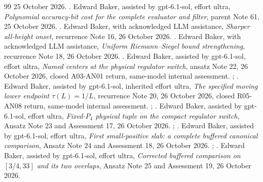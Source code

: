 \begin{thebibliography}{99}
25 October 2026.
.
 Edward Baker, assisted by gpt-6.1-sol, effort ultra,
\emph{Polynomial accuracy-bit cost for the complete evaluator and filter},
parent Note 61, 25 October 2026.
.
 Edward Baker, with acknowledged LLM assistance,
\emph{Sharper all-height onset}, recurrence Note 16, 26 October 2026.
.
 Edward Baker, with acknowledged LLM assistance,
\emph{Uniform Riemann--Siegel bound strengthening}, recurrence Note 18,
26 October 2026.
.
 Edward Baker, assisted by gpt-6.1-sol, effort ultra,
\emph{Named centers at the physical regulator switch}, ansatz Note 22,
26 October 2026, closed A03-AN01 return, same-model internal assessment.
; .
 Edward Baker, assisted by gpt-6.1-sol, inherited effort ultra,
\emph{The specified moving lower endpoint $\tau(L)=1/L$}, recurrence Note 20,
26 October 2026, closed R05-AN08 return, same-model internal assessment.
; .
 Edward Baker, assisted by gpt-6.1-sol, effort ultra,
\emph{Fixed-$P_4$ physical tuple on the compact regulator switch},
Ansatz Note 23 and Assessment 17, 26 October 2026.
;
.
 Edward Baker, assisted by gpt-6.1-sol, effort ultra,
\emph{First small-positive slab: a complete buffered canonical comparison},
Ansatz Note 24 and Assessment 18, 26 October 2026.
;
.
 Edward Baker, assisted by gpt-6.1-sol, effort ultra,
\emph{Corrected buffered comparison on $[3/4,33]$ and its two overlaps},
Ansatz Note 25 and Assessment 19, 26 October 2026.

\end{thebibliography}
